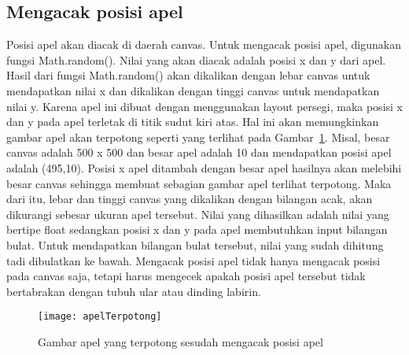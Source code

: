 \subsection{Mengacak posisi apel}
Posisi apel akan diacak di daerah canvas. Untuk mengacak posisi apel, digunakan fungsi Math.random(). Nilai yang akan diacak adalah posisi x dan y dari apel. Hasil dari fungsi Math.random() akan dikalikan dengan lebar canvas untuk mendapatkan nilai x dan dikalikan dengan tinggi canvas untuk mendapatkan nilai y. Karena apel ini dibuat dengan menggunakan layout persegi, maka posisi x dan y pada apel terletak di titik sudut kiri atas. Hal ini akan memungkinkan gambar apel akan terpotong seperti yang terlihat pada Gambar~\ref{fig:apelTerpotong}. Misal, besar canvas adalah 500 x 500 dan besar apel adalah 10 dan mendapatkan posisi apel adalah (495,10). Posisi x apel ditambah dengan besar apel hasilnya akan melebihi besar canvas sehingga membuat sebagian gambar apel terlihat terpotong. Maka dari itu, lebar dan tinggi canvas yang dikalikan dengan bilangan acak, akan dikurangi sebesar ukuran apel tersebut.  Nilai yang dihasilkan adalah nilai yang bertipe float sedangkan posisi x dan y pada apel membutuhkan input bilangan bulat. Untuk mendapatkan bilangan bulat tersebut, nilai yang sudah dihitung tadi dibulatkan ke bawah. Mengacak posisi apel tidak hanya mengacak posisi pada canvas saja, tetapi harus mengecek apakah posisi apel tersebut tidak bertabrakan dengan tubuh ular atau dinding labirin. 

\begin{figure}[H]
	\centering  
	\texttt{[image: apelTerpotong]}  
	\caption[Gambar apel yang terpotong sesudah mengacak posisi apel]{Gambar apel yang terpotong sesudah mengacak posisi apel}
	\label{fig:apelTerpotong} 
\end{figure}

